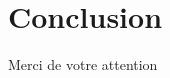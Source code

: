\documentclass{beamer}
\begin{document}
  \section{Conclusion}
  
  \begin{frame}
    \begin{center}
      Merci de votre attention
    \end{center}
  \end{frame}
\end{document}
